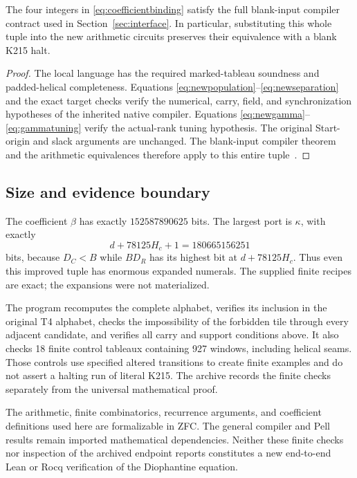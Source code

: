 \begin{proposition}
The four integers in \eqref{eq:coefficientbinding} satisfy the full
blank-input compiler contract used in Section~\ref{sec:interface}.
In particular, substituting this whole tuple into the new arithmetic
circuits preserves their equivalence with a blank K215 halt.
\end{proposition}
\begin{proof}
The local language has the required marked-tableau soundness and
padded-helical completeness.  Equations
\eqref{eq:newpopulation}--\eqref{eq:newseparation} and the exact target
checks verify the numerical, carry, field, and synchronization
hypotheses of the inherited native compiler.  Equations
\eqref{eq:newgamma}--\eqref{eq:gammatuning} verify the actual-rank
tuning hypothesis.  The original Start-origin and slack arguments are
unchanged.  The blank-input compiler theorem and the arithmetic
equivalences therefore apply to this entire tuple~\cite{blank,t4,rank}.
\end{proof}

\subsection{Size and evidence boundary}

The coefficient $\beta$ has exactly $152587890625$ bits.  The largest
port is $\kappa$, with exactly
\[
 d+78125H_c+1=180665156251
\]
bits, because $D_C<B$ while $BD_R$ has its highest bit at
$d+78125H_c$.  Thus even this improved tuple has enormous expanded
numerals.  The supplied finite recipes are exact; the expansions were
not materialized.

The program recomputes the complete alphabet, verifies its inclusion
in the original T4 alphabet, checks the impossibility of the forbidden
tile through every adjacent candidate, and verifies all carry and
support conditions above.  It also checks 18 finite control tableaux
containing 927 windows, including helical seams.  Those controls use
specified altered transitions to create finite examples and do not
assert a halting run of literal K215.  The archive records the finite
checks separately from the universal mathematical proof.

The arithmetic, finite combinatorics, recurrence arguments, and
coefficient definitions used here are formalizable in ZFC.  The
general compiler and Pell results remain imported mathematical
dependencies.  Neither these finite checks nor inspection of the
archived endpoint reports constitutes a new end-to-end Lean or Rocq
verification of the Diophantine equation.
